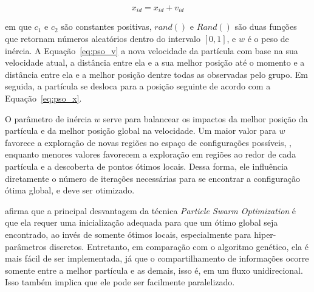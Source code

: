 \begin{equation}\label{eq:pso_x}
    x_{id} = x_{id} + v_{id}
\end{equation}

em que $c_{1}$ e $c_{2}$ são constantes positivas, $rand()$ e $Rand()$ são duas funções que retornam números aleatórios dentro do intervalo $[0,1]$, e $w$ é o peso de inércia. A Equação~\eqref{eq:pso_v} a nova velocidade da partícula com base na sua velocidade atual, a distância entre ela e a sua melhor posição até o momento e a distância entre ela e a melhor posição dentre todas as observadas pelo grupo. Em seguida, a partícula se desloca para a posição seguinte de acordo com a Equação~\eqref{eq:pso_x}.

O parâmetro de inércia $w$ serve para balancear os impactos da melhor posição da partícula e da melhor posição global na velocidade. Um maior valor para $w$ favorece a exploração de novas regiões no espaço de configurações possíveis, , enquanto menores valores favorecem a exploração em regiões ao redor de cada partícula e a descoberta de pontos ótimos locais. Dessa forma, ele influência diretamente o número de iterações necessárias para se encontrar a configuração ótima global, e deve ser otimizado.

 afirma que a principal desvantagem da técnica \textit{Particle Swarm Optimization} é que ela requer uma inicialização adequada para que um ótimo global seja encontrado, ao invés de somente ótimos locais, especialmente para hiper-parâmetros discretos. Entretanto, em comparação com o algoritmo genético, ela é mais fácil de ser implementada, já que o compartilhamento de informações ocorre somente entre a melhor partícula e as demais, isso é, em um fluxo unidirecional. Isso também implica que ele pode ser facilmente paralelizado.
